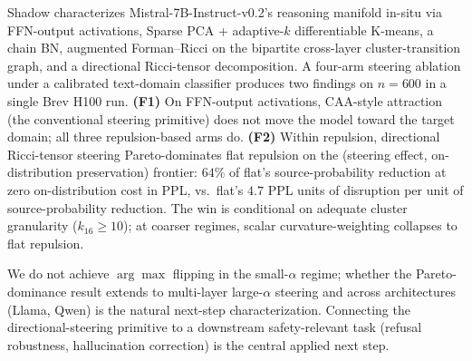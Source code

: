 \documentclass[10pt,twocolumn]{article}
\begin{document}
Shadow characterizes Mistral-7B-Instruct-v0.2's reasoning manifold in-situ via FFN-output activations, Sparse PCA + adaptive-$k$ differentiable K-means, a chain BN, augmented Forman--Ricci on the bipartite cross-layer cluster-transition graph, and a directional Ricci-tensor decomposition. A four-arm steering ablation under a calibrated text-domain classifier produces two findings on $n{=}600$ in a single Brev H100 run. \textbf{(F1)} On FFN-output activations, CAA-style attraction (the conventional steering primitive) does not move the model toward the target domain; all three repulsion-based arms do. \textbf{(F2)} Within repulsion, directional Ricci-tensor steering Pareto-dominates flat repulsion on the (steering effect, on-distribution preservation) frontier: $64\%$ of flat's source-probability reduction at zero on-distribution cost in PPL, vs.\ flat's $4.7$ PPL units of disruption per unit of source-probability reduction. The win is conditional on adequate cluster granularity ($k_{16}{\geq}10$); at coarser regimes, scalar curvature-weighting collapses to flat repulsion.

We do not achieve $\arg\max$ flipping in the small-$\alpha$ regime; whether the Pareto-dominance result extends to multi-layer large-$\alpha$ steering and across architectures (Llama, Qwen) is the natural next-step characterization. Connecting the directional-steering primitive to a downstream safety-relevant task (refusal robustness, hallucination correction) is the central applied next step.
\end{document}
